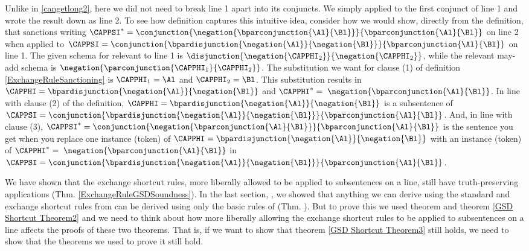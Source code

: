 Unlike in \ref{cangetlong2}, here we did not need to break line 1 apart into its conjuncts. We simply applied  to the first conjunct of line 1 and wrote the result down as line 2. To see how definition  captures this intuitive idea, consider how we would show, directly from the definition, that  sanctions writing $\CAPPSI^*=\conjunction{\negation{\bparconjunction{\Al}{\Bl}}}{\bparconjunction{\Al}{\Bl}}$ on line 2 when applied to $\CAPPSI=\conjunction{\bpardisjunction{\negation{\Al}}{\negation{\Bl}}}{\bparconjunction{\Al}{\Bl}}$ on line 1. The given schema for  relevant to line 1 is $\disjunction{\negation{\CAPPHI_2}}{\negation{\CAPPHI_2}}$, while the relevant may-add schema is $\negation{\parconjunction{\CAPPHI_1}{\CAPPHI_2}}$. The substitution we want for clause (1) of definition \ref{ExchangeRuleSanctioning} is $\CAPPHI_1=\Al$ and $\CAPPHI_2=\Bl$. This substitution results in $\CAPPHI=\bpardisjunction{\negation{\Al}}{\negation{\Bl}}$ and $\CAPPHI^*=\;\negation{\bparconjunction{\Al}{\Bl}}$. In line with clause (2) of the definition, $\CAPPHI=\bpardisjunction{\negation{\Al}}{\negation{\Bl}}$ is a subsentence of $\CAPPSI=\conjunction{\bpardisjunction{\negation{\Al}}{\negation{\Bl}}}{\bparconjunction{\Al}{\Bl}}$. And, in line with clause (3), $\CAPPSI^*=\conjunction{\negation{\bparconjunction{\Al}{\Bl}}}{\bparconjunction{\Al}{\Bl}}$ is the \GSL{} sentence you get when you replace one instance (token) of $\CAPPHI=\bpardisjunction{\negation{\Al}}{\negation{\Bl}}$ with an instance (token) of $\CAPPHI^*=\;\negation{\bparconjunction{\Al}{\Bl}}$ in $\CAPPSI=\conjunction{\bpardisjunction{\negation{\Al}}{\negation{\Bl}}}{\bparconjunction{\Al}{\Bl}}$.

\bigskip
\noindent{}We have shown that the exchange shortcut rules, more liberally allowed to be applied to subsentences on a line, still have truth-preserving applications (Thm. \ref{ExchangeRuleGSDSoundness}).
In the last section, , we showed that anything we can derive using the standard and exchange shortcut rules from \GSDP{} can be derived using only the basic rules of \GSD{} (Thm. ). 
But to prove this we used theorem  and theorem \ref{GSD Shortcut Theorem2} and we need to think about how more liberally allowing the exchange shortcut rules to be applied to subsentences on a line affects the proofs of these two theorems. 
That is, if we want to show that theorem \ref{GSD Shortcut Theorem3} still holds, we need to show that the theorems we used to prove it still hold.


